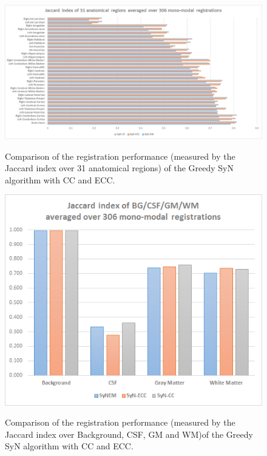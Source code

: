 \begin{figure}[H]
\centering
\label{fig:graph_seg}\includegraphics[width=1.0\linewidth]{./images/mono_graph_seg.png}\\
\caption{Comparison of the registration performance (measured by the Jaccard index over 31 anatomical regions) of the Greedy SyN algorithm with CC and ECC.}
\end{figure}

\begin{figure}[H]
\centering
\label{fig:graph_segTri_fill}\includegraphics[width=1.0\linewidth]{./images/mono_graph_segTri_fill.png}\\
\caption{Comparison of the registration performance (measured by the Jaccard index over Background, CSF, GM and WM)of the Greedy SyN algorithm with CC and ECC.}
\end{figure}

